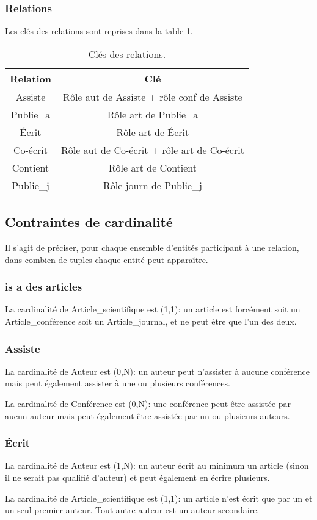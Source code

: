 \documentclass[a4paper, 12pt]{article}
\begin{document}
	\subsubsection{Relations}
	Les clés des relations sont reprises dans la table \ref{tab:cle_relations}.\par
	\begin{table}[!ht]
		\centering
		\begin{tabular}{|c|c|}
			\hline
			{\bf Relation} & {\bf Clé}\\ \hline
			\hline
			Assiste & Rôle \og aut\fg{} de Assiste + rôle \og conf\fg{} de Assiste\\ \hline
			Publie\_a & Rôle \og art\fg{} de Publie\_a\\ \hline
			Écrit & Rôle \og art\fg{} de Écrit\\ \hline
			Co-écrit & Rôle \og aut\fg{} de Co-écrit + rôle \og art\fg{} de Co-écrit\\ \hline
			Contient & Rôle \og art\fg{} de Contient\\ \hline
			Publie\_j & Rôle \og journ\fg{} de Publie\_j\\ \hline
		\end{tabular}
		\caption{Clés des relations.}
		\label{tab:cle_relations}
	\end{table}
	\newpage
	\subsection{Contraintes de cardinalité}
	Il s'agit de préciser, pour chaque ensemble d'entités participant à une relation, dans combien de tuples chaque entité peut apparaître.
	\subsubsection{\og is a\fg{} des articles}
	La cardinalité de Article\_scientifique est (1,1): un article est forcément soit un Article\_conférence soit un Article\_journal, et ne peut être que l'un des deux.
	\subsubsection{Assiste}
	La cardinalité de Auteur est (0,N): un auteur peut n'assister à aucune conférence mais peut également assister à une ou plusieurs conférences.\par
	La cardinalité de Conférence est (0,N): une conférence peut être assistée par aucun auteur mais peut également être assistée par un ou plusieurs auteurs.
	\subsubsection{Écrit}
	La cardinalité de Auteur est (1,N): un auteur écrit au minimum un article (sinon il ne serait pas qualifié d'auteur) et peut également en écrire plusieurs.\par
	La cardinalité de Article\_scientifique est (1,1): un article n'est écrit que par un et un seul premier auteur. Tout autre auteur est un auteur secondaire.
\end{document}
